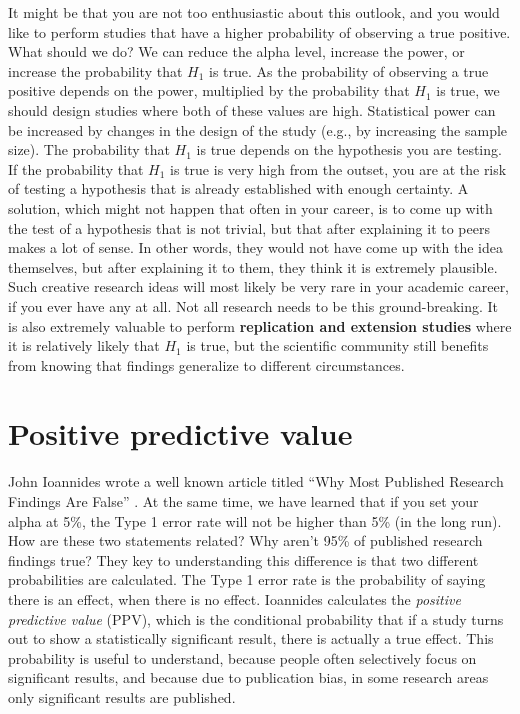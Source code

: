 \documentclass[
  oneside]{book}
\begin{document}
It might be that you are not too enthusiastic about this outlook, and you would like to perform studies that have a higher probability of observing a true positive. What should we do? We can reduce the alpha level, increase the power, or increase the probability that \(H_1\) is true. As the probability of observing a true positive depends on the power, multiplied by the probability that \(H_1\) is true, we should design studies where both of these values are high. Statistical power can be increased by changes in the design of the study (e.g., by increasing the sample size). The probability that \(H_1\) is true depends on the hypothesis you are testing. If the probability that \(H_1\) is true is very high from the outset, you are at the risk of testing a hypothesis that is already established with enough certainty. A solution, which might not happen that often in your career, is to come up with the test of a hypothesis that is not trivial, but that after explaining it to peers makes a lot of sense. In other words, they would not have come up with the idea themselves, but after explaining it to them, they think it is extremely plausible. Such creative research ideas will most likely be very rare in your academic career, if you ever have any at all. Not all research needs to be this ground-breaking. It is also extremely valuable to perform \textbf{replication and extension studies} where it is relatively likely that \(H_1\) is true, but the scientific community still benefits from knowing that findings generalize to different circumstances.

\hypertarget{ppv}{%
\section{Positive predictive value}\label{ppv}}

John Ioannides wrote a well known article titled ``Why Most Published Research Findings Are False'' \citep{ioannidis_why_2005}. At the same time, we have learned that if you set your alpha at 5\%, the Type 1 error rate will not be higher than 5\% (in the long run). How are these two statements related? Why aren't 95\% of published research findings true? They key to understanding this difference is that two different probabilities are calculated. The Type 1 error rate is the probability of saying there is an effect, when there is no effect. Ioannides calculates the \emph{positive predictive value} (PPV), which is the conditional probability that if a study turns out to show a statistically significant result, there is actually a true effect. This probability is useful to understand, because people often selectively focus on significant results, and because due to publication bias, in some research areas only significant results are published.
\end{document}
